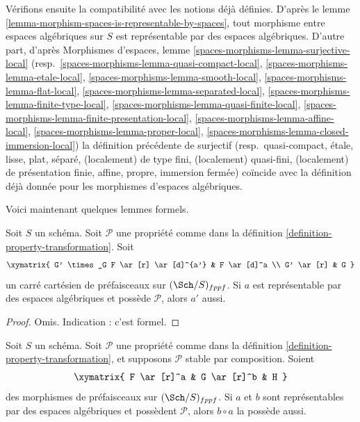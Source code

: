 \medskip\noindent
Vérifions ensuite la compatibilité avec les notions déjà définies. D'après le
lemme \ref{lemma-morphism-spaces-is-representable-by-spaces},
tout morphisme entre espaces algébriques sur $S$ est représentable par
des espaces algébriques. D'autre part, d'après
Morphismes d'espaces,
lemme \ref{spaces-morphisms-lemma-surjective-local}
(resp.\ \ref{spaces-morphisms-lemma-quasi-compact-local},
\ref{spaces-morphisms-lemma-etale-local},
\ref{spaces-morphisms-lemma-smooth-local},
\ref{spaces-morphisms-lemma-flat-local},
\ref{spaces-morphisms-lemma-separated-local},
\ref{spaces-morphisms-lemma-finite-type-local},
\ref{spaces-morphisms-lemma-quasi-finite-local},
\ref{spaces-morphisms-lemma-finite-presentation-local},
\ref{spaces-morphisms-lemma-affine-local},
\ref{spaces-morphisms-lemma-proper-local},
\ref{spaces-morphisms-lemma-closed-immersion-local})
la définition précédente de
surjectif
(resp.\ quasi-compact,
étale,
lisse,
plat,
séparé,
(localement) de type fini,
(localement) quasi-fini,
(localement) de présentation finie,
affine,
propre,
immersion fermée)
coïncide avec la définition déjà donnée pour les morphismes
d'espaces algébriques.

\medskip\noindent
Voici maintenant quelques lemmes formels.

\begin{lemma}
\label{lemma-base-change-transformation-property}
Soit $S$ un schéma.
Soit $\mathcal{P}$ une propriété comme dans la
définition \ref{definition-property-transformation}.
Soit
$$
\xymatrix{
G' \times_G F \ar[r] \ar[d]^{a'} & F \ar[d]^a \\
G' \ar[r] & G
}
$$
un carré cartésien de préfaisceaux sur $(\Sch/S)_{fppf}$.
Si $a$ est représentable par des espaces algébriques et possède $\mathcal{P}$,
alors $a'$ aussi.
\end{lemma}

\begin{proof}
Omis. Indication : c'est formel.
\end{proof}

\begin{lemma}
\label{lemma-composition-transformation-property}
Soit $S$ un schéma.
Soit $\mathcal{P}$ une propriété comme dans la
définition \ref{definition-property-transformation},
et supposons $\mathcal{P}$ stable par composition.
Soient
$$
\xymatrix{
F \ar[r]^a & G \ar[r]^b & H
}
$$
des morphismes de préfaisceaux sur $(\Sch/S)_{fppf}$.
Si $a$ et $b$ sont représentables par des espaces algébriques et possèdent
$\mathcal{P}$, alors $b \circ a$ la possède aussi.
\end{lemma}

